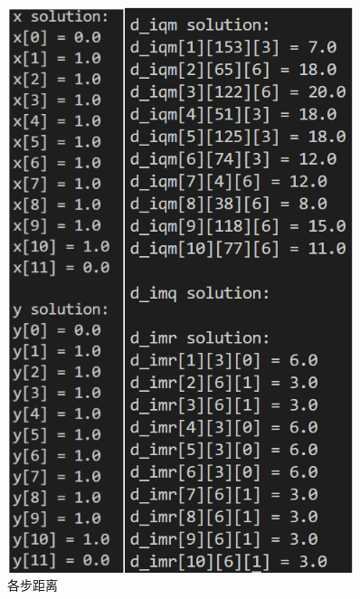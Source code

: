 \documentclass[withoutpreface,bwprint]{thesis-config}
\begin{document}
\begin{figure}[!htbp]
    \centering
    \begin{minipage}[b]{0.55\linewidth}
        \centering
        \includegraphics[width=0.9\textwidth]{figures/result2.6.png}
        \caption{各步距离}
    \end{minipage}%
\end{figure}
\end{document}
